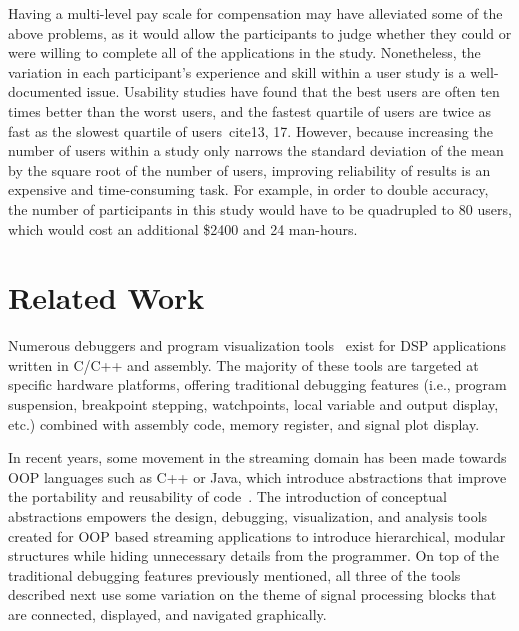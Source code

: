 \documentclass[11pt, letterpaper, onecolumn]{article}
\begin{document}
Having a  multi-level pay scale  for compensation may  have alleviated
some  of the above  problems, as  it would  allow the  participants to
judge  whether they  could  or were  willing  to complete  all of  the
applications  in  the  study.   Nonetheless,  the  variation  in  each
participant's  experience   and  skill  within  a  user   study  is  a
well-documented  issue. Usability  studies  have found  that the  best
users are often ten times better than the worst users, and the fastest
quartile  of  users are  twice  as fast  as  the  slowest quartile  of
users~cite{13, 17}.  However, because  increasing the number  of users
within a study only narrows the  standard deviation of the mean by the
square root of the  number of users\cite{13}, improving reliability of
results  is an  expensive and  time-consuming task.   For  example, in
order to  double accuracy,  the number of  participants in  this study
would  have  to  be  quadrupled  to  80 users,  which  would  cost  an
additional \$2400 and 24 man-hours.


\section{Related Work}

Numerous        debuggers       and        program       visualization
tools~\cite{42,35,7,39,19,6,9,36}  exist for DSP  applications written
in C/C++  and assembly.  The majority  of these tools  are targeted at
specific hardware  platforms, offering traditional  debugging features
(i.e.,  program suspension,  breakpoint  stepping, watchpoints,  local
variable  and  output display,  etc.)   combined  with assembly  code,
memory register, and signal plot display.

In recent years,  some movement in the streaming  domain has been made
towards  OOP   languages  such  as   C++  or  Java,   which  introduce
abstractions   that  improve  the   portability  and   reusability  of
code~\cite{30}. The  introduction of conceptual  abstractions empowers
the design,  debugging, visualization, and analysis  tools created for
OOP  based streaming applications  to introduce  hierarchical, modular
structures while  hiding unnecessary  details from the  programmer. On
top of  the traditional  debugging features previously  mentioned, all
three of the  tools described next use some variation  on the theme of
signal processing blocks that  are connected, displayed, and navigated
graphically.
\end{document}
